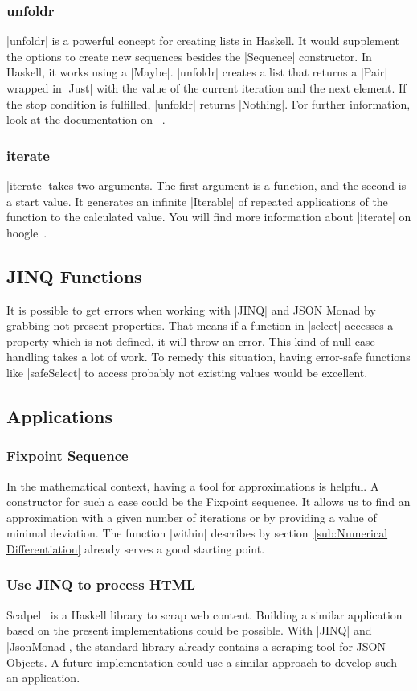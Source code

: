 \subsubsection{unfoldr}
\label{subsub:unfoldr}
|unfoldr| is a powerful concept for creating lists in Haskell. It would
supplement the options to create new sequences besides the |Sequence|
constructor. In Haskell, it works using a |Maybe|. |unfoldr| creates a list that returns 
a |Pair| wrapped in |Just| with the value of the current iteration and the next
element. If the stop condition is fulfilled, |unfoldr| returns |Nothing|. For
further information, look at the documentation on ~\cite{hoogle_unfoldr}.

\subsubsection{iterate}
\label{subsub:iterate}
|iterate| takes two arguments. The first argument is a function, and the second
is a start value. It generates an infinite |Iterable| of repeated applications of
the function to the calculated value. You will find more information about
|iterate| on hoogle~\cite{hoogle_iterate}.

\subsection{JINQ Functions}
\label{sub:JINQ Functions}
It is possible to get errors when working with |JINQ| and JSON Monad by grabbing
not present properties. That means if a function in |select| accesses a property
which is not defined, it will throw an error. This kind of null-case handling
takes a lot of work. To remedy this situation, having error-safe functions like
|safeSelect| to access probably not existing values would be excellent.

\subsection{Applications}
\label{sub:Applications}
\subsubsection{Fixpoint Sequence}
\label{subsub:Fixpoint Sequence}
In the mathematical context, having a tool for approximations is helpful. A
constructor for such a case could be the Fixpoint sequence. It allows us to
find an approximation with a given number of iterations or by providing a value
of minimal deviation. The function |within| describes by
section~\ref{sub:Numerical Differentiation} already serves a good starting
point.

\subsubsection{Use JINQ to process HTML}
\label{subsub:Use JINQ to process HTML}
Scalpel~\cite{scalpel} is a Haskell library to scrap web content. Building a
similar application based on the present implementations could be possible.
With |JINQ| and |JsonMonad|, the standard library already contains a scraping
tool for JSON Objects. A future implementation could use a similar approach to
develop such an application.
